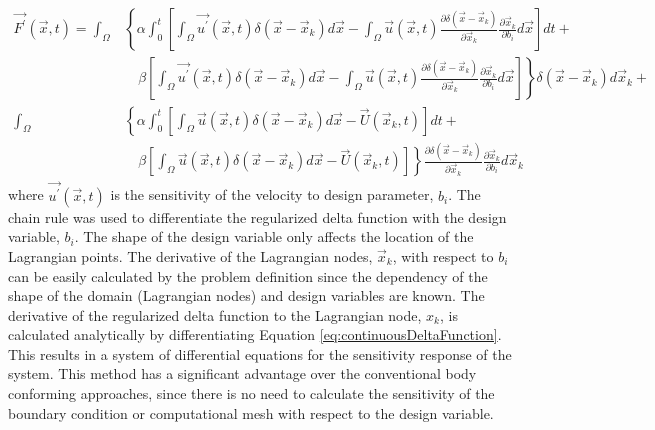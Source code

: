 \documentclass[12pt]{aiaa-pretty}
\begin{document}
%
\begin{equation}
\begin{aligned}\label{eq:forceingFunctionDerivative}
	\vec{F^\prime}(\vec{x}, t) = 
	\int_\Omega 
	&\left\{
 	\alpha \int_0^t
	\left[
	\int_\Omega \vec{u^\prime} (\vec{x}, t) \delta(\vec{x} - \vec{x}_k) d\vec{x} - 
	\int_\Omega \vec{u} (\vec{x}, t) \frac{\partial \delta(\vec{x} - \vec{x}_k)}{\partial \vec{x}_k} \frac{\partial \vec{x}_k}{\partial b_i} d\vec{x}
	\right]dt + \right. \\
	&\left.
	\quad \beta
	\left[
	\int_\Omega \vec{u^\prime} (\vec{x}, t) \delta(\vec{x} - \vec{x}_k) d\vec{x} - 
	\int_\Omega \vec{u} (\vec{x}, t) \frac{\partial \delta(\vec{x} - \vec{x}_k)}{\partial \vec{x}_k} \frac{\partial \vec{x}_k}{\partial b_i} d\vec{x}
	\right]
	\right\} \delta(\vec{x} - \vec{x}_k) d\vec{x}_k + \\
	\int_\Omega 
	&\left\{
 	\alpha \int_0^t
	\left[
	\int_\Omega \vec{u} (\vec{x}, t) \delta(\vec{x} - \vec{x}_k) d\vec{x} - \vec{U}\left( \vec{x}_k, t \right)
	\right]dt + \right. \\
	&\left.
	\quad \beta \left[
	\int_\Omega \vec{u} (\vec{x}, t) \delta(\vec{x} - \vec{x}_k) d\vec{x} - \vec{U}\left( \vec{x}_k, t \right)
	\right]
	\right\} \frac{\partial \delta(\vec{x} - \vec{x}_k)}{\partial \vec{x}_k} \frac{\partial \vec{x}_k}{\partial b_i} d\vec{x}_k
\end{aligned}
\end{equation}
%
where $\vec{u^\prime}\left( \vec{x}, t \right)$ is the sensitivity of the velocity to design parameter, $b_i$. The chain rule was used to differentiate the regularized delta function with the design variable, $b_i$. The shape of the design variable only affects the location of the Lagrangian points. The derivative of the Lagrangian nodes, $\vec{x}_k$, with respect to $b_i$ can be easily calculated by the problem definition since the dependency of the shape of the domain (Lagrangian nodes) and design variables are known. The derivative of the regularized delta function to the Lagrangian node, $x_k$, is calculated analytically by differentiating Equation \eqref{eq:continuousDeltaFunction}. This results in a system of differential equations for the sensitivity response of the system. This method has a significant advantage over the conventional body conforming approaches, since there is no need to calculate the sensitivity of the boundary condition or computational mesh with respect to the design variable.

\end{document}

